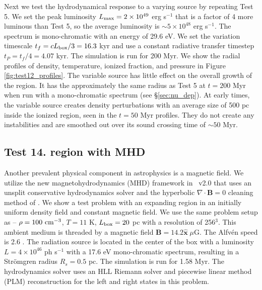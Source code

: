 \documentclass[useAMS,usenatbib,a4paper]{mn2e}
\begin{document}
Next we test the hydrodynamical response to a varying source by
repeating Test 5.  We set the peak luminosity $L_{\rm max} = 2 \times
10^{49}$ erg s$^{-1}$ that is a factor of 4 more luminous than Test 5,
so the average luminosity is $\sim 5 \times 10^{48}$ erg s$^{-1}$.
The spectrum is mono-chromatic with an energy of 29.6 eV.  We set the
variation timescale $t_f = cL_{\rm box}/3 = 16.3$ kyr and use a
constant radiative transfer timestep $t_P = t_f/4 = 4.07$ kyr.  The
simulation is run for 200 Myr.  We show the radial profiles of
density, temperature, ionized fraction, and pressure in Figure
\ref{fig:test12_profiles}.  The variable source has little effect on
the overall growth of the \hii region.  It has the approximately
the same radius as Test 5 at $t = 200$ Myr when run with a
mono-chromatic spectrum (see \S\ref{sec:nu_dep}).  At early times, the
variable source creates density perturbations with an average size of
500 pc inside the ionized region, seen in the $t = 50$ Myr profiles.
They do not create any instabilities and are smoothed out over its
sound crossing time of $\sim 50$ Myr.

\subsection{Test 14. \hii region with MHD}

Another prevalent physical component in astrophysics is a magnetic
field.  We utilize the new magnetohydrodynamics (MHD) framework
\citep{Wang09} in \enzo~v2.0 that uses an unsplit conservative
hydrodynamics solver and the hyperbolic $\nabla \cdot \mathbf{B} = 0$
cleaning method of \citet{Dedner02}.  We show a test problem with an
expanding \hii region in an initially uniform density field and
constant magnetic field.  We use the same problem setup as
\citet{Krumholz07_ART} -- $\rho = 100~\cubecm$, $T = 11$ K, $L_{\rm
  box} = 20$ pc with a resolution of 256$^3$.  This ambient medium is
threaded by a magnetic field $\mathbf{B} = 14.2 \hat{\mathbf{x}} \;
\mu\mathrm{G}$.  The Alfv\'{e}n speed is 2.6 \kms.  The radiation
source is located in the center of the box with a luminosity $L = 4
\times 10^{46}$ ph s$^{-1}$ with a 17.6 eV mono-chromatic spectrum,
resulting in a Str\"{o}mgren radius $R_s = 0.5$ pc.  The simulation is
run for 1.58 Myr.  The hydrodynamics solver uses an HLL Riemann solver
\citep{HLL} and piecewise linear method (PLM) reconstruction
\citep{PLM} for the left and right states in this problem.
\end{document}
